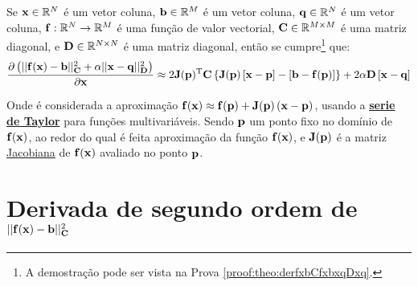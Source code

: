 \begin{theorem}\label{theo:derfxbCfxbxqDxq}
Se 
$\VECTOR{x}\in \mathbb{R}^N$ é um vetor coluna, 
$\VECTOR{b}\in \mathbb{R}^M$ é um vetor coluna,
$\VECTOR{q}\in \mathbb{R}^N$ é um vetor coluna, 
$\VECTOR{f}: \mathbb{R}^{N}\rightarrow \mathbb{R}^{M}$ é uma função de valor vectorial, 
$\MATRIX{C} \in \mathbb{R}^{M\times M}$ é uma matriz diagonal, e
$\MATRIX{D} \in \mathbb{R}^{N\times N}$ é uma matriz diagonal, 
então se cumpre\footnote{A demostração pode ser vista na Prova \ref{proof:theo:derfxbCfxbxqDxq}.} que:
\begin{equation}
\frac{\partial \left(||\VECTOR{f}(\VECTOR{x})-\VECTOR{b}||_{\MATRIX{C}}^2+\alpha||\VECTOR{x}-\VECTOR{q}||_{\MATRIX{D}}^2\right)}{\partial \VECTOR{x}} \approx
2 \MATRIX{J}(\VECTOR{p})^{\transpose}\MATRIX{C}\left\{\MATRIX{J}(\VECTOR{p})\left[\VECTOR{x} - \VECTOR{p}\right]-\left[\VECTOR{b}-\VECTOR{f}(\VECTOR{p})\right] \right\}
+2\alpha\MATRIX{D}\left[\VECTOR{x}-\VECTOR{q}\right]
\end{equation}

Onde é considerada a aproximação
$\VECTOR{f}(\VECTOR{x})\approx \VECTOR{f}(\VECTOR{p})+\MATRIX{J}(\VECTOR{p})\left(\VECTOR{x}-\VECTOR{p}\right)$,
usando a \hyperref[def:taylor]{\textbf{serie de Taylor}} para funções multivariáveis. Sendo $\VECTOR{p}$ um ponto fixo no domínio de $\VECTOR{f}(\VECTOR{x})$,  ao redor do qual é feita  aproximação
da função $\VECTOR{f}(\VECTOR{x})$,
e $\MATRIX{J}(\VECTOR{p})$ é a matriz \hyperref[def:jacobian]{Jacobiana} \cite{Jacobian} de $\VECTOR{f}(\VECTOR{x})$ avaliado no ponto $\VECTOR{p}$.


\end{theorem}


\section{Derivada de segundo ordem de $||\VECTOR{f}(\VECTOR{x})-\VECTOR{b}||_{\MATRIX{C}}^2$ 
}



